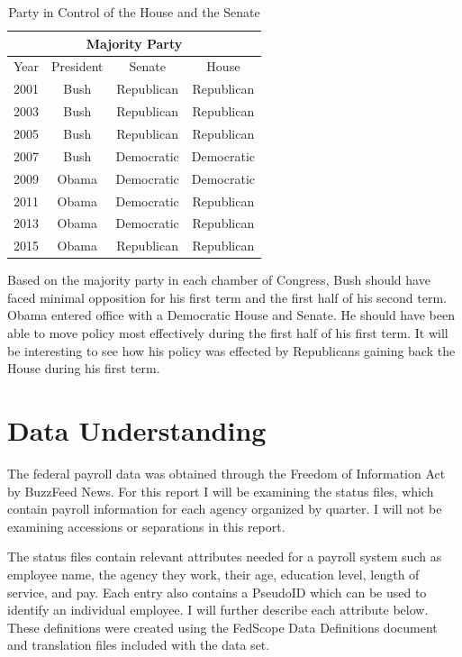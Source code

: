 \documentclass{article}
\begin{document}
        \begin{center}
            \begin{table}
                \centering
                \begin{tabular}{ |c|c|c|c| }
                    \hline
                    \multicolumn{4}{|c|}{Majority Party} \\
                    \hline
                    Year & President & Senate & House \\
                    \hline
                    2001 & Bush & Republican & Republican \\
                    2003 & Bush & Republican & Republican \\
                    2005 & Bush & Republican & Republican \\
                    2007 & Bush & Democratic & Democratic \\
                    2009 & Obama & Democratic & Democratic \\
                    2011 & Obama & Democratic & Republican \\
                    2013 & Obama & Democratic & Republican \\
                    2015 & Obama & Republican & Republican \\
                    \hline
                \end{tabular}
                \caption{Party in Control of the House and the Senate}
                \label{tab:1}
            \end{table}
        \end{center}

    Based on the majority party in each chamber of Congress, Bush should have faced minimal opposition for his first term and the first half of his second term. Obama entered office with a Democratic House and Senate. He should have been able to move policy most effectively during the first half of his first term. It will be interesting to see how his policy was effected by Republicans gaining back the House during his first term.

\section{Data Understanding}
The federal payroll data was obtained through the Freedom of Information Act by BuzzFeed News. For this report I will be examining the status files, which contain payroll information for each agency organized by quarter. I will not be examining accessions or separations in this report.
\par
The status files contain relevant attributes needed for a payroll system such as employee name, the agency they work, their age, education level, length of service, and pay. Each entry also contains a PseudoID which can be used to identify an individual employee. I will further describe each attribute below. These definitions were created using the FedScope Data Definitions document and translation files included with the data set.\cite{datadefs}
\end{document}
